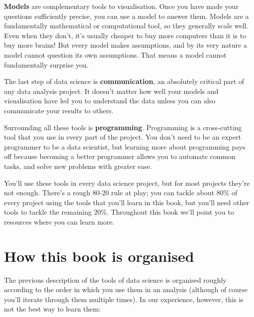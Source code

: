 \documentclass[]{book}
\begin{document}
\textbf{Models} are complementary tools to visualisation. Once you have
made your questions sufficiently precise, you can use a model to answer
them. Models are a fundamentally mathematical or computational tool, so
they generally scale well. Even when they don't, it's usually cheaper to
buy more computers than it is to buy more brains! But every model makes
assumptions, and by its very nature a model cannot question its own
assumptions. That means a model cannot fundamentally surprise you.

The last step of data science is \textbf{communication}, an absolutely
critical part of any data analysis project. It doesn't matter how well
your models and visualisation have led you to understand the data unless
you can also communicate your results to others.

Surrounding all these tools is \textbf{programming}. Programming is a
cross-cutting tool that you use in every part of the project. You don't
need to be an expert programmer to be a data scientist, but learning
more about programming pays off because becoming a better programmer
allows you to automate common tasks, and solve new problems with greater
ease.

You'll use these tools in every data science project, but for most
projects they're not enough. There's a rough 80-20 rule at play; you can
tackle about 80\% of every project using the tools that you'll learn in
this book, but you'll need other tools to tackle the remaining 20\%.
Throughout this book we'll point you to resources where you can learn
more.

\section{How this book is organised}\label{how-this-book-is-organised}

The previous description of the tools of data science is organised
roughly according to the order in which you use them in an analysis
(although of course you'll iterate through them multiple times). In our
experience, however, this is not the best way to learn them:
\end{document}
